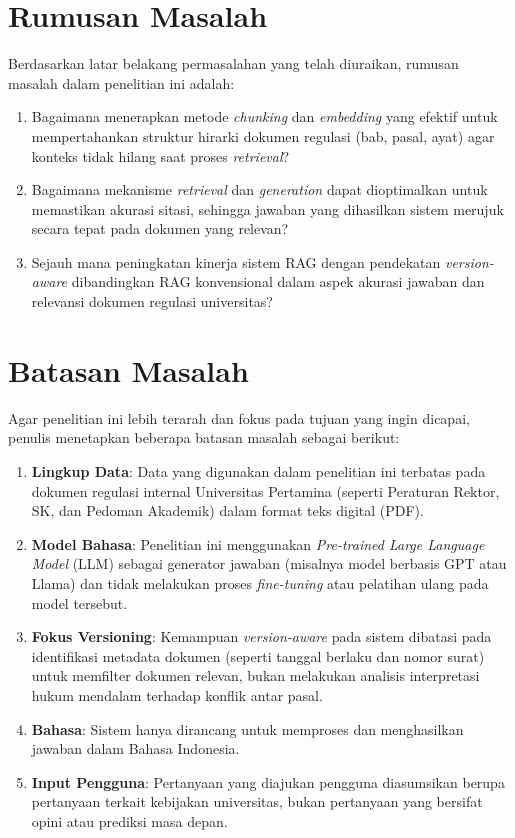 \section{Rumusan Masalah}
    Berdasarkan latar belakang permasalahan yang telah diuraikan, rumusan masalah dalam penelitian ini adalah:
    \begin{enumerate}
        \item Bagaimana menerapkan metode \textit{chunking} dan \textit{embedding} yang efektif untuk mempertahankan struktur hirarki dokumen regulasi (bab, pasal, ayat) agar konteks tidak hilang saat proses \textit{retrieval}?

        \item Bagaimana mekanisme \textit{retrieval} dan \textit{generation} dapat dioptimalkan untuk memastikan akurasi sitasi, sehingga jawaban yang dihasilkan sistem merujuk secara tepat pada dokumen yang relevan?

        \item Sejauh mana peningkatan kinerja sistem RAG dengan pendekatan \textit{version-aware} dibandingkan RAG konvensional dalam aspek akurasi jawaban dan relevansi dokumen regulasi universitas?
    \end{enumerate}

\newpage
 
\section{Batasan Masalah}
    Agar penelitian ini lebih terarah dan fokus pada tujuan yang ingin dicapai, penulis menetapkan beberapa batasan masalah sebagai berikut:
    \begin{enumerate}
        \item \textbf{Lingkup Data}: Data yang digunakan dalam penelitian ini terbatas pada dokumen regulasi internal Universitas Pertamina (seperti Peraturan Rektor, SK, dan Pedoman Akademik) dalam format teks digital (PDF).

        \item \textbf{Model Bahasa}: Penelitian ini menggunakan \textit{Pre-trained Large Language Model} (LLM) sebagai generator jawaban (misalnya model berbasis GPT atau Llama) dan tidak melakukan proses \textit{fine-tuning} atau pelatihan ulang pada model tersebut.

        \item \textbf{Fokus Versioning}: Kemampuan \textit{version-aware} pada sistem dibatasi pada identifikasi metadata dokumen (seperti tanggal berlaku dan nomor surat) untuk memfilter dokumen relevan, bukan melakukan analisis interpretasi hukum mendalam terhadap konflik antar pasal.

        \item \textbf{Bahasa}: Sistem hanya dirancang untuk memproses dan menghasilkan jawaban dalam Bahasa Indonesia.

        \item \textbf{Input Pengguna}: Pertanyaan yang diajukan pengguna diasumsikan berupa pertanyaan terkait kebijakan universitas, bukan pertanyaan yang bersifat opini atau prediksi masa depan.
    \end{enumerate}

